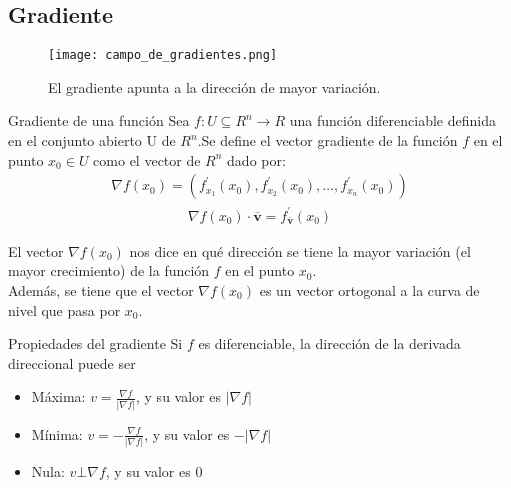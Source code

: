 \documentclass[a4paper, twoside]{article}
\numberwithin{equation}{section}
\numberwithin{figure}{section}
\numberwithin{table}{section}
\newcommand{\vect}[1]{\overline{\textbf{#1}}}
\begin{document}
\subsection{Gradiente}
\begin{minipage}{0.31\textwidth}
	\begin{figure}[H]
		\centering
		\texttt{[image: campo\_de\_gradientes.png]}
		\caption{El gradiente apunta a la dirección de mayor variación.}
	\end{figure}
\end{minipage}
\begin{minipage}{0.6\textwidth}
	\begin{definicion*}{Gradiente de una función}
		Sea $f:U\subseteq R^n \rightarrow R$ una función diferenciable definida en el conjunto abierto U de $R^n$.Se define el vector gradiente de la función $f$ en el punto $x_0\in U$ como el vector de $R^n$ dado por: \\
		\begin{align}
			\nabla f(x_0)=(f^\prime_{x_1}(x_0),f^\prime_{x_2}(x_0),\ldots,f^\prime_{x_n}(x_0))
		\end{align}
		\begin{align}
			\nabla f(x_0)\cdot\vect{v}=f^\prime_{\vect{v}}(x_0)
		\end{align}
		
		El vector $\nabla f(x_0)$ nos dice en qué dirección se tiene la mayor variación (el mayor crecimiento) de la función $f$ en el punto	$x_0$.\\
		
		Además, se tiene que el vector $\nabla f(x_0)$ es un vector ortogonal a la curva de nivel que pasa por $x_0$.
	\end{definicion*}
\end{minipage}

\begin{corolario*}{Propiedades del gradiente}
	Si $f$ es diferenciable, la dirección de la derivada direccional	puede ser
	\begin{itemize}
		\item Máxima: $v=\frac{\nabla f}{\left|\nabla f\right|}$, y su valor es $\left|\nabla f\right|$
		\item Mínima: $v=-\frac{\nabla f}{\left|\nabla f\right|}$, y su valor es $-\left|\nabla f\right|$
		\item Nula: $v\bot\nabla f$, y su valor es 0
	\end{itemize}
\end{corolario*}
\end{document}
